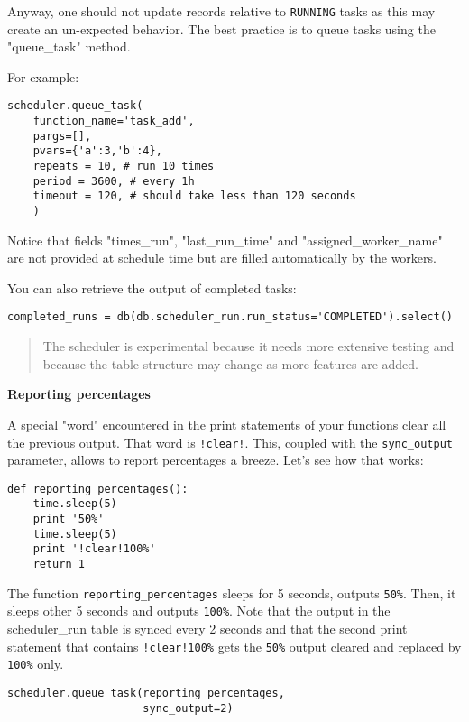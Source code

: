 \documentclass[justified,sixbynine,notoc]{tufte-book}
\def\ft{\small\tt}
\begin{document}
\begin{fullwidth}
Anyway, one should not update records relative to {\ft RUNNING} tasks as this may create an un-expected behavior. The best practice is to queue tasks using the "queue\_task" method.

For example:

\begin{lstlisting}
scheduler.queue_task(
    function_name='task_add',
    pargs=[],
    pvars={'a':3,'b':4},
    repeats = 10, # run 10 times
    period = 3600, # every 1h
    timeout = 120, # should take less than 120 seconds
    )
\end{lstlisting}

Notice that fields "times\_run", "last\_run\_time" and "assigned\_worker\_name" are not provided at schedule time but are filled automatically by the workers.

You can also retrieve the output of completed tasks:

\begin{lstlisting}
completed_runs = db(db.scheduler_run.run_status='COMPLETED').select()
\end{lstlisting}

\begin{quote}The scheduler is experimental because it needs more extensive testing and because the table structure may change as more features are added.\end{quote}
{\bf Reporting percentages}

A special "word" encountered in the print statements of your functions clear all
the previous output. That word is {\ft !clear!}.
This, coupled with the {\ft sync\_output} parameter, allows to report percentages
a breeze. Let's see how that works:

\begin{lstlisting}
def reporting_percentages():
    time.sleep(5)
    print '50%'
    time.sleep(5)
    print '!clear!100%'
    return 1
\end{lstlisting}

The function {\ft reporting\_percentages} sleeps for 5 seconds, outputs {\ft 50\%}.
Then, it sleeps other 5 seconds and outputs {\ft 100\%}. Note that the output in the scheduler\_run table is synced every 2 seconds and that the second print statement that contains {\ft !clear!100\%} gets the {\ft 50\%} output cleared and replaced by {\ft 100\%} only.

\begin{lstlisting}
scheduler.queue_task(reporting_percentages,
                     sync_output=2)
\end{lstlisting}


\end{fullwidth}
\end{document}
